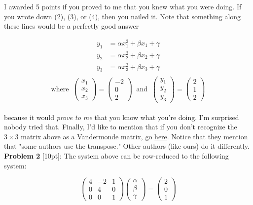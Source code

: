 \documentclass{article}
\def\a{\alpha}
\def\b{\beta}
\def\c{\gamma}
\begin{document}
I awarded 5 points if you proved to me that you knew what you were doing. If you wrote down (2), (3), or (4), then you nailed it. Note that something along these lines would be a perfectly good answer

\begin{align*}
y_1 &=  \a x_1^2 + \b x_1 + \c \\
y_2 &=  \a x_2^2 + \b x_2 + \c \\
y_3 &=  \a x_3^2 + \b x_3 + \c  \\
\end{align*}
\[
\text{where} \;\; \begin{pmatrix} x_1 \\ x_2 \\ x_3 \end{pmatrix} = \begin{pmatrix} -2 \\ 0 \\ 2 \end{pmatrix} \;\; \text{and} \;\; \begin{pmatrix} y_1 \\ y_2 \\ y_3 \end{pmatrix} = \begin{pmatrix} 2 \\ 1 \\ 2 \end{pmatrix}
\] \\

because it would \textit{prove to me} that you know what you're doing. I'm surprised nobody tried that. Finally, I'd like to mention that if you don't  recognize the $3 \times 3$ matrix above as a Vandermonde matrix, go {\color{cyan} \href{http://en.wikipedia.org/wiki/Vandermonde_matrix}{here}}. Notice that they mention that "some authors use the transpose." Other authors (like ours) do it differently.\\

\textbf{Problem 2} [10pt]: The system above can be row-reduced to the following system:

\[
\begin{pmatrix} 4 & -2 & 1 \\ 0 & 4 & 0 \\ 0 & 0 & 1 \end{pmatrix} \begin{pmatrix} \a \\ \b \\ \c \end{pmatrix} = \begin{pmatrix} 2 \\ 0 \\ 1 \end{pmatrix}
\]
\end{document}
